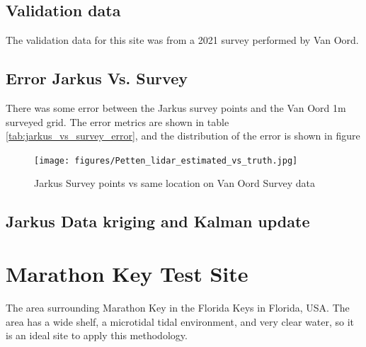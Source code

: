 \subsection{Validation data}
The validation data for this site was from a 2021 survey performed by Van Oord.
\subsection{Error Jarkus Vs. Survey}
There was some error between the Jarkus survey points and the Van Oord 1m surveyed grid. The error metrics are shown in table \ref{tab:jarkus_vs_survey_error}, and the distribution of the error is shown in figure


\begin{figure}[h]
    \centering
    \texttt{[image: figures/Petten\_lidar\_estimated\_vs\_truth.jpg]}
    \caption{Jarkus Survey points vs same location on Van Oord Survey data}
    \label{fig:jarkus_vs_survey}
\end{figure}

\subsection{Jarkus Data kriging and Kalman update}



\section{Marathon Key Test Site}
The area surrounding Marathon Key in the Florida Keys in Florida, USA. The area has a wide shelf, a microtidal tidal environment, and very clear water, so it is an ideal site to apply this methodology. 

